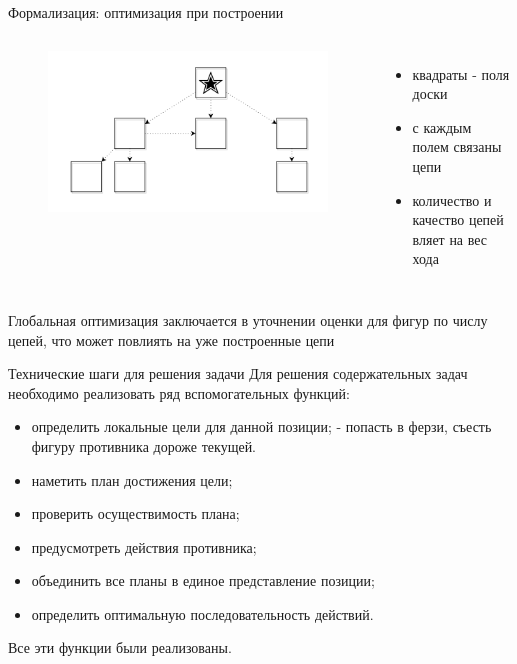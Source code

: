 \begin{frame}{Формализация: оптимизация при построении}
\begin{columns}
\begin{figure}
\includegraphics[scale=0.2]{./pictures/piece.png}
\end{figure}
\begin{itemize}
\item квадраты - поля доски
\item с каждым полем связаны цепи
\item количество и качество цепей вляет на вес хода
\end{itemize}
\end{columns}
Глобальная оптимизация заключается в уточнении оценки для фигур по числу цепей, что может повлиять на уже построенные цепи
\end{frame}


\begin{frame}{Технические шаги для решения задачи}
Для решения содержательных задач необходимо реализовать ряд вспомогательных функций:
\begin{itemize}
\item определить локальные цели для данной позиции; - попасть в ферзи, съесть фигуру противника дороже текущей.
\item наметить план достижения цели;
\item проверить осуществимость плана;
\item предусмотреть действия противника;
\item объединить все планы в единое представление позиции;
\item определить оптимальную последовательность действий.
\end{itemize}
Все эти функции были реализованы.
\end{frame}

